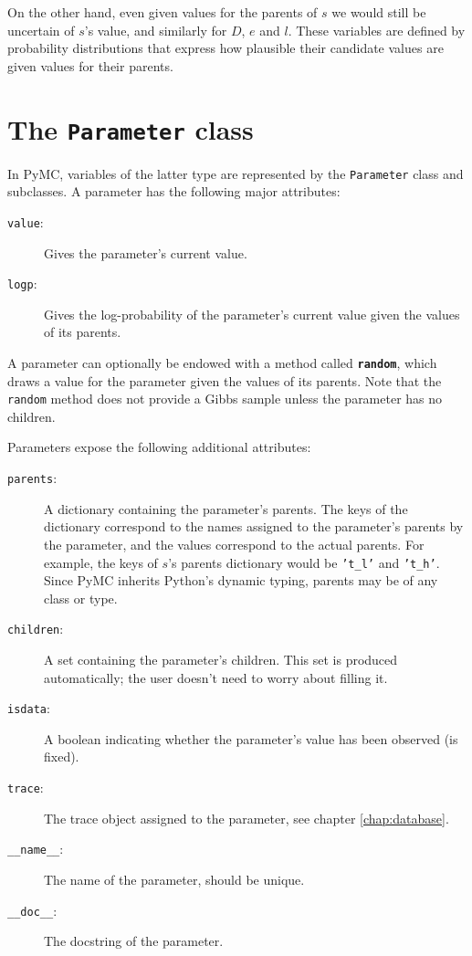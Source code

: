 On the other hand, even given values for the parents of $s$ we would still be uncertain of $s$'s value, and similarly for $D$, $e$ and $l$. These variables are defined by probability distributions that express how plausible their candidate values are given values for their parents.
 

\section{The \texttt{Parameter} class}

In PyMC, variables of the latter type are represented by the \texttt{Parameter} class and subclasses. A parameter has the following major attributes: 
\begin{description}
    \item[\texttt{value}:] Gives the parameter's current value.
    \item[\texttt{logp}:] Gives the log-probability of the parameter's current value given the values of its parents.
\end{description}
A parameter can optionally be endowed with a method called \texttt{\bfseries random}, which draws a value for the parameter given the values of its parents. Note that the \texttt{random} method does not provide a Gibbs sample unless the parameter has no children.

Parameters expose the following additional attributes:
\begin{description}
    \item[\texttt{parents}:] A dictionary containing the parameter's parents. The keys of the dictionary correspond to the names assigned to the parameter's parents by the parameter, and the values correspond to the actual parents. For example, the keys of $s$'s parents dictionary would be \texttt{'t\_l'} and \texttt{'t\_h'}. Since PyMC inherits Python's dynamic typing, parents may be of any class or type.
    \item[\texttt{children}:] A set containing the parameter's children. This set is produced automatically; the user doesn't need to worry about filling it.
    \item[\texttt{isdata}:] A boolean indicating whether the parameter's value has been observed (is fixed).
    \item[\texttt{trace}:] The trace object assigned to the parameter, see chapter \ref{chap:database}.
    \item[\texttt{\_\_name\_\_}:] The name of the parameter, should be unique.
    \item[\texttt{\_\_doc\_\_}:] The docstring of the parameter.
\end{description}

